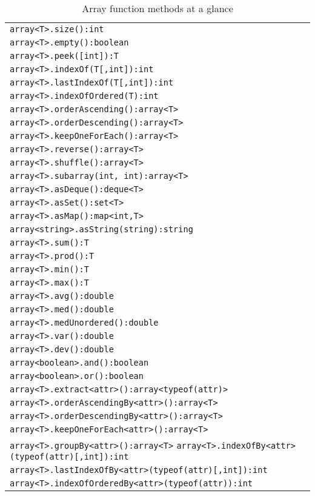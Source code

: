 \begin{table}[htbp]
\centering
\begin{tabular}{|l|}
\hline
\texttt{array<T>.size():int}\\
\texttt{array<T>.empty():boolean}\\
\texttt{array<T>.peek([int]):T}\\
\texttt{array<T>.indexOf(T[,int]):int}\\
\texttt{array<T>.lastIndexOf(T[,int]):int}\\
\texttt{array<T>.indexOfOrdered(T):int}\\
\texttt{array<T>.orderAscending():array<T>}\\
\texttt{array<T>.orderDescending():array<T>}\\
\texttt{array<T>.keepOneForEach():array<T>}\\
\texttt{array<T>.reverse():array<T>}\\
\texttt{array<T>.shuffle():array<T>}\\
\texttt{array<T>.subarray(int, int):array<T>}\\
\texttt{array<T>.asDeque():deque<T>}\\
\texttt{array<T>.asSet():set<T>}\\
\texttt{array<T>.asMap():map<int,T>}\\
\texttt{array<string>.asString(string):string}\\
\hline
\texttt{array<T>.sum():T}\\
\texttt{array<T>.prod():T}\\
\texttt{array<T>.min():T}\\
\texttt{array<T>.max():T}\\
\texttt{array<T>.avg():double}\\
\texttt{array<T>.med():double}\\
\texttt{array<T>.medUnordered():double}\\
\texttt{array<T>.var():double}\\
\texttt{array<T>.dev():double}\\
\texttt{array<boolean>.and():boolean}\\
\texttt{array<boolean>.or():boolean}\\
\hline
\texttt{array<T>.extract<attr>():array<typeof(attr)>}\\
\texttt{array<T>.orderAscendingBy<attr>():array<T>}\\
\texttt{array<T>.orderDescendingBy<attr>():array<T>}\\
\texttt{array<T>.keepOneForEach<attr>():array<T>}\\
\texttt{array<T>.groupBy<attr>():array<T>}
\texttt{array<T>.indexOfBy<attr>(typeof(attr)[,int]):int}\\
\texttt{array<T>.lastIndexOfBy<attr>(typeof(attr)[,int]):int}\\
\texttt{array<T>.indexOfOrderedBy<attr>(typeof(attr)):int}\\
\hline
\end{tabular}
\caption{Array function methods at a glance}
\end{table}

